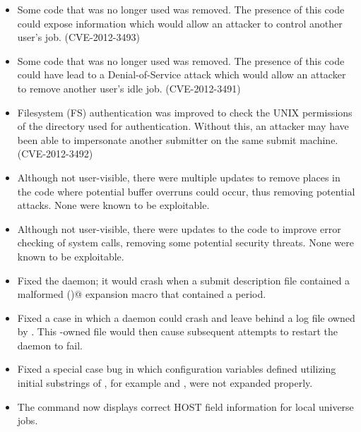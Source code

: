 \begin{itemize}

\item \Security Some code that was no longer used was removed.  The presence
of this code could expose information which would allow an attacker to control
another user's job.  (CVE-2012-3493)

\item \Security Some code that was no longer used was removed.  The presence
of this code could have lead to a Denial-of-Service attack which would allow
an attacker to remove another user's idle job.  (CVE-2012-3491)

\item \Security Filesystem (FS) authentication was improved to check the UNIX
permissions of the directory used for authentication.  Without this, an
attacker may have been able to impersonate another submitter on the same submit
machine.  (CVE-2012-3492)

\item \Security Although not user-visible, there were multiple updates to
remove places in the code where potential buffer overruns could occur, thus
removing potential attacks.  None were known to be exploitable.

\item \Security Although not user-visible, there were updates to the code to
improve error checking of system calls, removing some potential security
threats.  None were known to be exploitable.




\item Fixed the  daemon; 
it would crash when a submit description file
contained a malformed \verb@$$()@ expansion macro that contained
a period.

\item Fixed a case in which a daemon could crash and leave behind a log
file owned by .  This -owned file would then cause
subsequent attempts to restart the daemon to fail.

\item Fixed a special case bug in which configuration variables
defined utilizing initial substrings of ,
for example   and  ,  
were not expanded properly.

\item The command   now displays correct HOST field 
information for local universe jobs.

\end{itemize}

